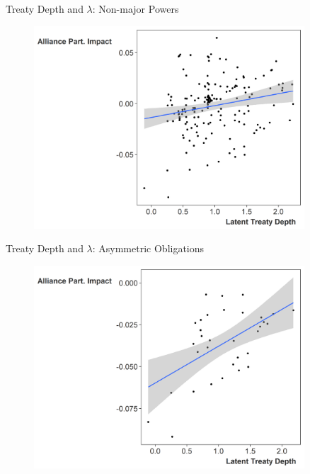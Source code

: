 \documentclass[12pt]{beamer}
\begin{document}
\begin{frame}{Treaty Depth and $\lambda$: Non-major Powers}

\begin{figure}
	\centering
		\includegraphics[width=0.9\textwidth]{ld-lambda-min.png}
	\label{fig:ld-lambda-min}
\end{figure}


\end{frame}


\begin{frame}{Treaty Depth and $\lambda$: Asymmetric Obligations}

\begin{figure}
	\centering
		\includegraphics[width=0.9\textwidth]{ld-lambda-min-asymm.png}
	\label{fig:ld-lambda-min-asymm}
\end{figure}


\end{frame}
\end{document}
